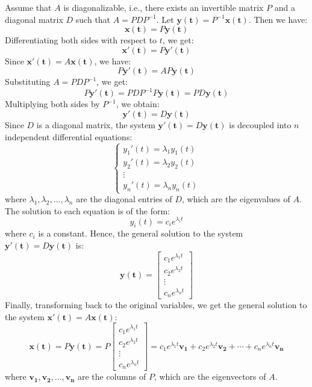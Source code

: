 \documentclass[10pt, a4paper]{article}
\newcommand{\vt}[1]{\mathbf{#1}}
\begin{document}
Assume that $A$ is diagonalizable, i.e., there exists an invertible matrix $P$ and a diagonal matrix $D$ such that $A = PDP^{-1}$. Let $\vt{y(t)} = P^{-1}\vt{x(t)}$. Then we have:
\[
\vt{x(t)} = P\vt{y(t)}
\]
Differentiating both sides with respect to $t$, we get:
\[
\vt{x'(t)} = P\vt{y'(t)}
\]
Since $\vt{x'(t)} = A\vt{x(t)}$, we have:
\[
P\vt{y'(t)} = AP\vt{y(t)}
\]
Substituting $A = PDP^{-1}$, we get:
\[
P\vt{y'(t)} = PDP^{-1}P\vt{y(t)} = PD\vt{y(t)}
\]
Multiplying both sides by $P^{-1}$, we obtain:
\[
\vt{y'(t)} = D\vt{y(t)}
\]
Since $D$ is a diagonal matrix, the system $\vt{y'(t)} = D\vt{y(t)}$ is decoupled into $n$ independent differential equations:
\[
\begin{cases}
y_1'(t) = \lambda_1 y_1(t)\\
y_2'(t) = \lambda_2 y_2(t)\\
\vdots\\
y_n'(t) = \lambda_n y_n(t)
\end{cases}
\]
where $\lambda_1, \lambda_2, \ldots, \lambda_n$ are the diagonal entries of $D$, which are the eigenvalues of $A$. The solution to each equation is of the form:
\[
y_i(t) = c_i e^{\lambda_i t}
\]
where $c_i$ is a constant. Hence, the general solution to the system $\vt{y'(t)} = D\vt{y(t)}$ is:
\[
\vt{y(t)} = \begin{bmatrix}
c_1 e^{\lambda_1 t}\\
c_2 e^{\lambda_2 t}\\
\vdots\\
c_n e^{\lambda_n t}
\end{bmatrix}
\]
Finally, transforming back to the original variables, we get the general solution to the system $\vt{x'(t)} = A\vt{x(t)}$:
\[
\vt{x(t)} = P\vt{y(t)} = P \begin{bmatrix}
c_1 e^{\lambda_1 t}\\
c_2 e^{\lambda_2 t}\\
\vdots\\
c_n e^{\lambda_n t}
\end{bmatrix} = c_1 e^{\lambda_1 t} \vt{v_1} + c_2 e^{\lambda_2 t} \vt{v_2} + \cdots + c_n e^{\lambda_n t} \vt{v_n}
\]
where $\vt{v_1}, \vt{v_2}, \ldots, \vt{v_n}$ are the columns of $P$, which are the eigenvectors of $A$.
\end{document}

